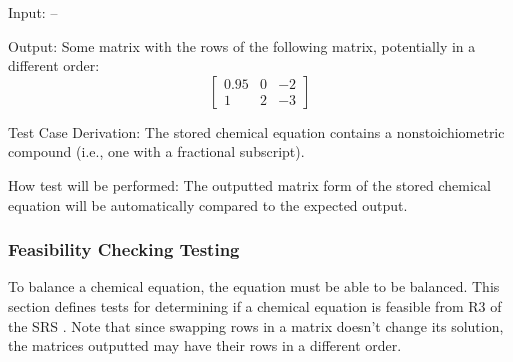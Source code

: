 \documentclass[12pt, titlepage]{article}
\begin{document}
\begin{enumerate}
    Input: --

    Output: Some matrix with the rows of the following matrix, potentially in a
    different order:
    $$\begin{bmatrix}
        0.95 & 0 & -2 \\
        1    & 2 & -3
      \end{bmatrix}$$

    Test Case Derivation: The stored chemical equation contains a
    nonstoichiometric compound (i.e., one with a fractional subscript).

    How test will be performed: The outputted matrix form of the stored
    chemical equation will be automatically compared to the expected output.

\end{enumerate}

\subsubsection{Feasibility Checking Testing}

To balance a chemical equation, the equation must be able to be balanced. This
section defines tests for determining if a chemical equation is feasible from
R3 of the SRS . 
Note that since swapping rows in a matrix doesn't change its solution, the
matrices outputted may have their rows in a different order.
\end{document}
